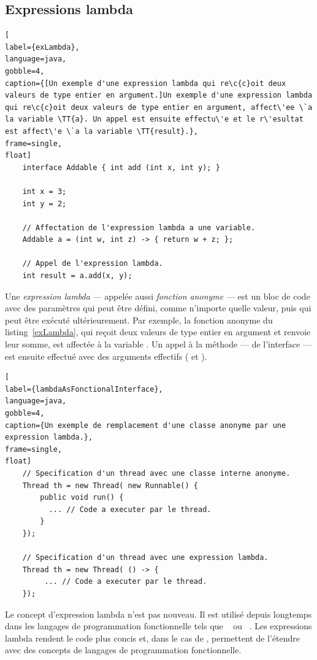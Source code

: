 \subsection{Expressions lambda}



\begin{lstlisting}[
label={exLambda},
language=java,
gobble=4,
caption={[Un exemple d'une expression lambda qui re\c{c}oit deux valeurs de type entier en argument.]Un exemple d'une expression lambda qui re\c{c}oit deux valeurs de type entier en argument, affect\'ee \`a la variable \TT{a}. Un appel est ensuite effectu\'e et le r\'esultat est affect\'e \`a la variable \TT{result}.},
frame=single,
float]
    interface Addable { int add (int x, int y); }
    
    int x = 3;
    int y = 2;
    
    // Affectation de l'expression lambda a une variable.
    Addable a = (int w, int z) -> { return w + z; };

    // Appel de l'expression lambda.
    int result = a.add(x, y);    
\end{lstlisting}



Une \emph{expression lambda} ---  appel\'ee aussi \emph{fonction anonyme} --- est un bloc de code avec des param\`etres qui peut \^etre d\'efini, comme n'importe quelle valeur, puis qui peut \^etre ex\'ecut\'e ult\'erieurement. Par exemple, la fonction anonyme du listing~\ref{exLambda}, qui re\c{c}oit deux valeurs de type entier en argument et renvoie leur somme, est affect\'ee \`a la variable . Un appel \`a la m\'ethode  --- de l'interface  --- est ensuite effectu\'e avec des arguments effectifs ( et ).


\begin{lstlisting}[
label={lambdaAsFonctionalInterface},
language=java,
gobble=4,
caption={Un exemple de remplacement d'une classe anonyme par une expression lambda.},
frame=single,
float]
    // Specification d'un thread avec une classe interne anonyme.
	Thread th = new Thread( new Runnable() {
		public void run() {
          ... // Code a executer par le thread.
		}
	});

    // Specification d'un thread avec une expression lambda.
	Thread th = new Thread( () -> {
         ... // Code a executer par le thread.
	});
\end{lstlisting}


Le concept d'expression lambda n'est pas nouveau. Il est utilis\'e depuis longtemps dans les langages de programmation fonctionnelle tels que ~\citep{Steele84} ou ~\citep{HudakWad90,hutton2016programming}.
%
Les expressions lambda rendent le code plus concis et, dans le cas de , permettent de l'\'etendre avec des concepts de langages de programmation fonctionnelle. 

